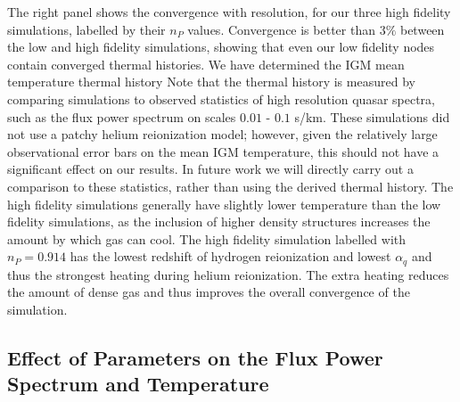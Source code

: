 \documentclass[a4paper,11pt]{article}
\begin{document}
The right panel shows the convergence with resolution, for our three high fidelity simulations, labelled by their $n_P$ values. Convergence is better than $3\%$ between the low and high fidelity simulations, showing that even our low fidelity nodes contain converged thermal histories. We have determined the IGM mean temperature thermal history Note that the thermal history is measured by comparing simulations to observed statistics of high resolution quasar spectra, such as the flux power spectrum on scales $0.01$ - $0.1$ s/km. These simulations did not use a patchy helium reionization model; however, given the relatively large observational error bars on the mean IGM temperature, this should not have a significant effect on our results. In future work we will directly carry out a comparison to these statistics, rather than using the derived thermal history. The high fidelity simulations generally have slightly lower temperature than the low fidelity simulations, as the inclusion of higher density structures increases the amount by which gas can cool. The high fidelity simulation labelled with $n_P=0.914$ has the lowest redshift of hydrogen reionization and lowest $\alpha_q$ and thus the strongest heating during helium reionization. The extra heating reduces the amount of dense gas and thus improves the overall convergence of the simulation.


\subsection{Effect of Parameters on the Flux Power Spectrum and Temperature}
\label{sec:singleparams}
\end{document}
